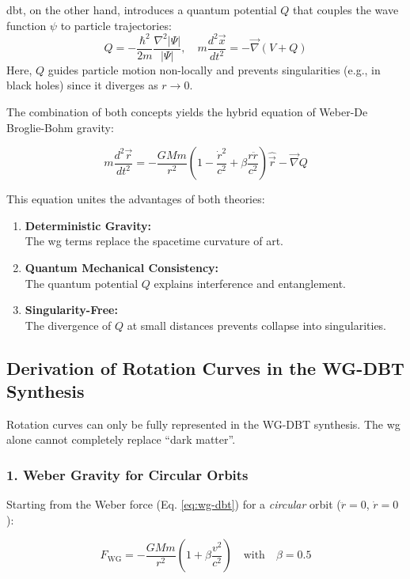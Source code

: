 \gls{dbt}, on the other hand, introduces a quantum potential $Q$ that couples the wave function $\psi$ to particle trajectories:
\begin{equation}
    \label{eq:wg-dbt-q}
    Q = -\frac{\hbar^2}{2m}\frac{\nabla^2 |\Psi|}{|\Psi|}, \quad m\frac{d^2\vec{x}}{dt^2} = -\vec{\nabla}(V + Q)
\end{equation}
Here, $Q$ guides particle motion non-locally and prevents singularities (e.g., in black holes) since it diverges as $r \to 0$.

The combination of both concepts yields the hybrid equation of Weber-De Broglie-Bohm gravity:

\begin{equation}
    m\frac{d^2\vec{r}}{dt^2} = -\frac{GMm}{r^2}\left(1 - \frac{\dot{r}^2}{c^2} + \beta \frac{r\ddot{r}}{c^2}\right)\hat{{\vec{r}}} - \vec{\nabla} Q
\end{equation}

This equation unites the advantages of both theories:
\begin{enumerate}
    \item \textbf{Deterministic Gravity:}\\The \gls{wg} terms replace the spacetime curvature of \gls{art}.
    \item \textbf{Quantum Mechanical Consistency:}\\The quantum potential $Q$ explains interference and entanglement.
    \item \textbf{Singularity-Free:}\\The divergence of $Q$ at small distances prevents collapse into singularities.
\end{enumerate}

\subsection{Derivation of Rotation Curves in the WG-DBT Synthesis}
Rotation curves can only be fully represented in the WG-DBT synthesis. The \gls{wg} alone cannot completely replace \enquote{dark matter}.

\subsubsection{1. Weber Gravity for Circular Orbits}
Starting from the Weber force (Eq. \ref{eq:wg-dbt}) for a \textit{circular} orbit ($\ddot{r} = 0$, $\dot{r} = 0$):

\begin{equation}
F_{\text{WG}} = -\frac{GMm}{r^2}\left(1 + \beta\frac{v^2}{c^2}\right) \quad \text{with} \quad \beta = 0.5
\end{equation}

